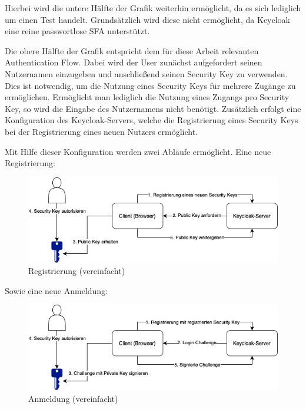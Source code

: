 Hierbei wird die untere Hälfte der Grafik weiterhin ermöglicht, da es sich lediglich um einen Test handelt. Grundsätzlich wird diese nicht ermöglicht, da Keycloak eine reine passwortlose \ac{SFA} unterstützt.

Die obere Hälfte der Grafik entspricht dem für diese Arbeit relevanten Authentication Flow. Dabei wird der User zunächst aufgefordert seinen Nutzernamen einzugeben und anschließend seinen Security Key zu verwenden. Dies ist notwendig, um die Nutzung eines Security Keys für mehrere Zugänge zu ermöglichen. Ermöglicht man lediglich die Nutzung eines Zugangs pro Security Key, so wird die Eingabe des Nutzernamens nicht benötigt. Zusätzlich erfolgt eine Konfiguration des Keycloak-Servers, welche die Registrierung eines Security Keys bei der Registrierung eines neuen Nutzers ermöglicht.

Mit Hilfe dieser Konfiguration werden zwei Abläufe ermöglicht. Eine neue Registrierung:

\begin{figure}[H]
	\centering 
	\includegraphics[width=1\textwidth]{img/abbildungen/register_simplified.png}
	\captionsetup{format=hang}
	\caption{Registrierung (vereinfacht)}
\end{figure}

Sowie eine neue Anmeldung:

\begin{figure}[H]
	\centering 
	\includegraphics[width=1\textwidth]{img/abbildungen/login_simplified.png}
	\captionsetup{format=hang}
	\caption{Anmeldung (vereinfacht)}
\end{figure}

